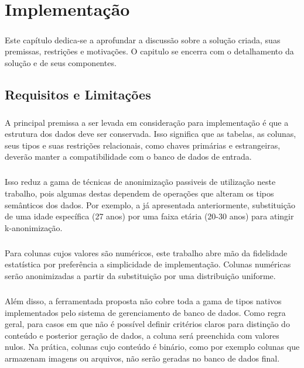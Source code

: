 \chapter{Implementação}
\label{cap4}

\paragraph{} Este capítulo dedica-se a aprofundar a discussão sobre a solução criada, suas premissas, restrições e motivações. O capitulo se encerra com o detalhamento da solução e de seus componentes.

\section{Requisitos e Limitações}

\paragraph{} A principal premissa a ser levada em consideração para implementação é que a estrutura dos dados deve ser conservada. Isso significa que as tabelas, as colunas, seus tipos e suas restrições relacionais, como chaves primárias e estrangeiras, deverão manter a compatibilidade com o banco de dados de entrada.

\paragraph{} Isso reduz a gama de técnicas de anonimização passiveis de utilização neste trabalho, pois algumas destas dependem de operações que alteram os tipos semânticos dos dados. Por exemplo, a já apresentada anteriormente, substituição de uma idade específica (27 anos) por uma faixa etária (20-30 anos) para atingir k-anonimização.

\paragraph{} Para colunas cujos valores são numéricos, este trabalho abre mão da fidelidade estatística por preferência a simplicidade de implementação. Colunas numéricas serão anonimizadas a partir da substituição por uma distribuição uniforme.

\paragraph{} Além disso, a ferramentada proposta não cobre toda a gama de tipos nativos implementados pelo sistema de gerenciamento de banco de dados. Como regra geral, para casos em que não é possível definir critérios claros para distinção do conteúdo e posterior geração de dados, a coluna será preenchida com valores nulos. Na prática, colunas cujo conteúdo é binário, como por exemplo colunas que armazenam imagens ou arquivos, não serão geradas no banco de dados final.

